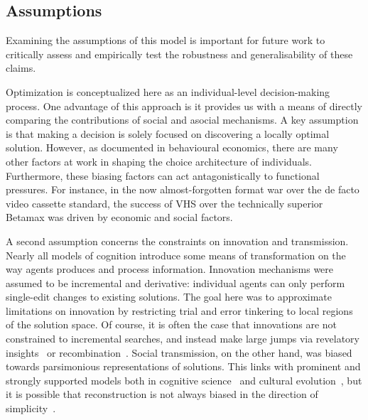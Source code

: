 \documentclass{article}
\begin{document}
\subsection{Assumptions}
Examining the assumptions of this model is important for future work to critically assess and empirically test the robustness and generalisability of these claims. 

Optimization is conceptualized here as an individual-level decision-making process. One advantage of this approach is it provides us with a means of directly comparing the contributions of social and asocial mechanisms. A key assumption is that making a decision is solely focused on discovering a locally optimal solution. However, as documented in behavioural economics, there are many other factors at work in shaping the choice architecture of individuals. Furthermore, these biasing factors can act antagonistically to functional pressures. For instance, in the now almost-forgotten format war over the de facto video cassette standard, the success of VHS over the technically superior Betamax was driven by economic and social factors.

A second assumption concerns the constraints on innovation and transmission. Nearly all models of cognition introduce some means of transformation on the way agents produces and process information. Innovation mechanisms were assumed to be incremental and derivative: individual agents can only perform single-edit changes to existing solutions. The goal here was to approximate limitations on innovation by restricting trial and error tinkering to local regions of the solution space. Of course, it is often the case that innovations are not constrained to incremental searches, and instead make large jumps via revelatory insights~\cite{villani2007agent} or recombination~\cite{charbonneau2016modularity}. Social transmission, on the other hand, was biased towards parsimonious representations of solutions. This links with prominent and strongly supported models both in cognitive science~\cite{xxxx} and cultural evolution~\cite{xxxx}, but it is possible that reconstruction is not always biased in the direction of simplicity~\cite{xxxx}.
\end{document}
